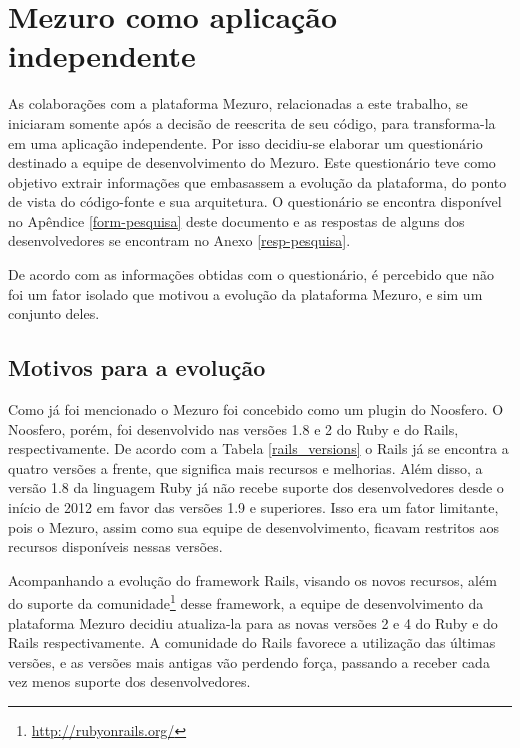 \section{Mezuro como aplicação independente}

As colaborações com a plataforma Mezuro, relacionadas a este trabalho, se iniciaram somente após a decisão de reescrita de seu código, para transforma-la em uma aplicação independente. Por isso decidiu-se elaborar um questionário destinado a equipe de desenvolvimento do Mezuro. Este questionário teve como objetivo extrair informações que embasassem a evolução da plataforma, do ponto de vista do código-fonte e sua arquitetura. O questionário se encontra disponível no Apêndice \ref{form-pesquisa} deste documento e as respostas de alguns dos desenvolvedores se encontram no Anexo \ref{resp-pesquisa}.

De acordo com as informações obtidas com o questionário, é percebido que não foi um fator isolado que motivou a evolução da plataforma Mezuro, e sim um conjunto deles. 

\subsection{Motivos para a evolução}


  
Como já foi mencionado o Mezuro foi concebido como um plugin do Noosfero. O Noosfero, porém, foi desenvolvido nas versões 1.8 e 2 do Ruby e do Rails, respectivamente. De acordo com a Tabela \ref{rails_versions} o Rails já se encontra a quatro versões a frente, que significa mais recursos e melhorias. Além disso, a versão 1.8 da linguagem Ruby já não recebe suporte dos desenvolvedores desde o início de 2012 em favor das versões 1.9 e superiores. Isso era um fator limitante, pois o Mezuro, assim como sua equipe de desenvolvimento, ficavam restritos aos recursos disponíveis nessas versões.

Acompanhando a evolução do framework Rails, visando os novos recursos, além do suporte da comunidade\footnote{\url{http://rubyonrails.org/}} desse framework, a equipe de desenvolvimento da plataforma Mezuro decidiu atualiza-la para as novas versões 2 e 4 do Ruby e do Rails respectivamente. A comunidade do Rails favorece a utilização das últimas versões, e as versões mais antigas vão perdendo força, passando a receber cada vez menos suporte dos desenvolvedores.

